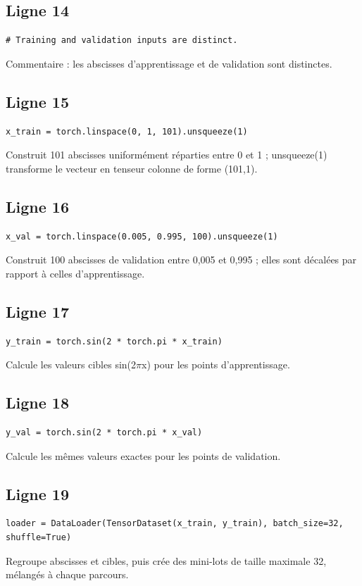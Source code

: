 \documentclass[11pt,a4paper]{article}
\begin{document}
\subsection*{Ligne 14}
\begin{lstlisting}
# Training and validation inputs are distinct.
\end{lstlisting}
Commentaire : les abscisses d'apprentissage et de validation sont distinctes.

\subsection*{Ligne 15}
\begin{lstlisting}
x_train = torch.linspace(0, 1, 101).unsqueeze(1)
\end{lstlisting}
Construit 101 abscisses uniformément réparties entre 0 et 1 ; unsqueeze(1) transforme le vecteur en tenseur colonne de forme (101,1).

\subsection*{Ligne 16}
\begin{lstlisting}
x_val = torch.linspace(0.005, 0.995, 100).unsqueeze(1)
\end{lstlisting}
Construit 100 abscisses de validation entre 0,005 et 0,995 ; elles sont décalées par rapport à celles d'apprentissage.

\subsection*{Ligne 17}
\begin{lstlisting}
y_train = torch.sin(2 * torch.pi * x_train)
\end{lstlisting}
Calcule les valeurs cibles sin(2$\pi$x) pour les points d'apprentissage.

\subsection*{Ligne 18}
\begin{lstlisting}
y_val = torch.sin(2 * torch.pi * x_val)
\end{lstlisting}
Calcule les mêmes valeurs exactes pour les points de validation.

\subsection*{Ligne 19}
\begin{lstlisting}
loader = DataLoader(TensorDataset(x_train, y_train), batch_size=32, shuffle=True)
\end{lstlisting}
Regroupe abscisses et cibles, puis crée des mini-lots de taille maximale 32, mélangés à chaque parcours.
\end{document}
